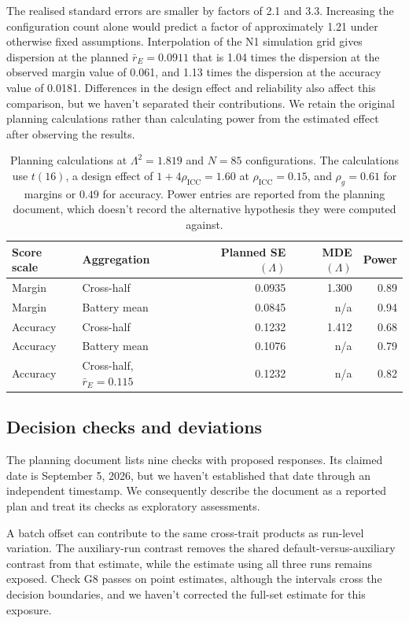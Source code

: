 The realised standard errors are smaller by factors of 2.1 and 3.3. Increasing the configuration count alone would predict a factor of approximately 1.21 under otherwise fixed assumptions. Interpolation of the N1 simulation grid gives dispersion at the planned $\bar r_E=0.0911$ that is 1.04 times the dispersion at the observed margin value of 0.061, and 1.13 times the dispersion at the accuracy value of 0.0181. Differences in the design effect and reliability also affect this comparison, but we haven't separated their contributions. We retain the original planning calculations rather than calculating power from the estimated effect after observing the results.

\begin{table}[!htb]
\centering
\caption{Planning calculations at $\Lambda^2=1.819$ and $N=85$ configurations. The calculations use $t(16)$, a design effect of $1+4\rho_{\mathrm{ICC}}=1.60$ at $\rho_{\mathrm{ICC}}=0.15$, and $\rho_g=0.61$ for margins or $0.49$ for accuracy. Power entries are reported from the planning document, which doesn't record the alternative hypothesis they were computed against.}
\label{tab:original4}
\small\setlength{\tabcolsep}{4pt}\renewcommand{\arraystretch}{1.12}
\begin{tabular}{llrrr}\toprule
Score scale & Aggregation & Planned SE$(\Lambda)$ & MDE$(\Lambda)$ & Power\\\midrule
Margin & Cross-half & 0.0935 & 1.300 & 0.89\\
Margin & Battery mean & 0.0845 & n/a & 0.94\\
Accuracy & Cross-half & 0.1232 & 1.412 & 0.68\\
Accuracy & Battery mean & 0.1076 & n/a & 0.79\\
Accuracy & Cross-half, $\bar r_E=0.115$ & 0.1232 & n/a & 0.82\\\bottomrule
\end{tabular}
\end{table}

\subsection{Decision checks and deviations}
The planning document lists nine checks with proposed responses. Its claimed date is September 5, 2026, but we haven't established that date through an independent timestamp. We consequently describe the document as a reported plan and treat its checks as exploratory assessments.

A batch offset can contribute to the same cross-trait products as run-level variation. The auxiliary-run contrast removes the shared default-versus-auxiliary contrast from that estimate, while the estimate using all three runs remains exposed. Check G8 passes on point estimates, although the intervals cross the decision boundaries, and we haven't corrected the full-set estimate for this exposure.

